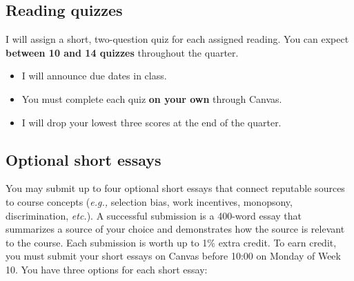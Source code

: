 \documentclass[11pt]{article}
\begin{document}
\subsection*{Reading quizzes} 

I will assign a short, two-question quiz for each assigned reading. You can expect \textbf{between 10 and 14 quizzes} throughout the quarter.
\begin{itemize}
	\setlength{\itemsep}{0pt}
	\item I will announce due dates in class. 
	\item You must complete each quiz \textbf{on your own} through Canvas.
	\item I will drop your lowest three scores at the end of the quarter.
\end{itemize}




\subsection*{Optional short essays}

You may submit up to four optional short essays that connect reputable sources to course concepts (\textit{e.g.,} selection bias, work incentives, monopsony, discrimination, \textit{etc.}). A successful submission is a 400-word essay that summarizes a source of your choice and demonstrates how the source is relevant to the course. Each submission is worth up to 1\% extra credit. To earn credit, you must submit your short essays on Canvas before 10:00 on Monday of Week 10. You have three options for each short essay:
\end{document}
